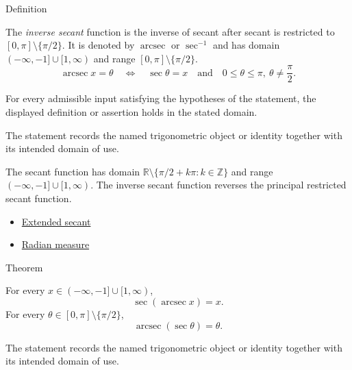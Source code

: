 

\begin{definitionbox}{Definition}
\begin{definition}
\label{def:inverse-secant}
The \emph{inverse secant} function is the inverse of secant after secant is
restricted to $[0,\pi]\setminus\{\pi/2\}$. It is denoted by $\operatorname{arcsec}$ or
$\sec^{-1}$ and has domain $(-\infty,-1]\cup[1,\infty)$ and range
$[0,\pi]\setminus\{\pi/2\}$.
\[
  \operatorname{arcsec} x=\theta
  \quad\Longleftrightarrow\quad
  \sec\theta=x
  \quad\text{and}\quad
  0\leq\theta\leq\pi,\ \theta\neq\frac{\pi}{2}.
\]
\end{definition}
\end{definitionbox}
\begin{remark*}
For every admissible input satisfying the hypotheses of the statement, the
displayed definition or assertion holds in the stated domain.
\end{remark*}

\begin{remark*}[Interpretation]
The statement records the named trigonometric object or identity together with
its intended domain of use.
\end{remark*}

\begin{remark*}
The secant function has domain
$\mathbb{R}\setminus\{\pi/2+k\pi:k\in\mathbb{Z}\}$ and range
$(-\infty,-1]\cup[1,\infty)$. The inverse secant function reverses the
principal restricted secant function.
\end{remark*}
\begin{dependencies}
\begin{itemize}
  \item \hyperref[def:extended-secant]{Extended secant}
  \item \hyperref[def:radian-measure]{Radian measure}
\end{itemize}
\end{dependencies}

\begin{theorembox}{Theorem}
\begin{theorem}
\label{thm:inverse-secant-identities}
For every $x\in(-\infty,-1]\cup[1,\infty)$,
\[
  \sec(\operatorname{arcsec} x)=x.
\]
For every $\theta\in[0,\pi]\setminus\{\pi/2\}$,
\[
  \operatorname{arcsec}(\sec\theta)=\theta.
\]
\end{theorem}
\end{theorembox}
\begin{remark*}[Interpretation]
The statement records the named trigonometric object or identity together with
its intended domain of use.
\end{remark*}

